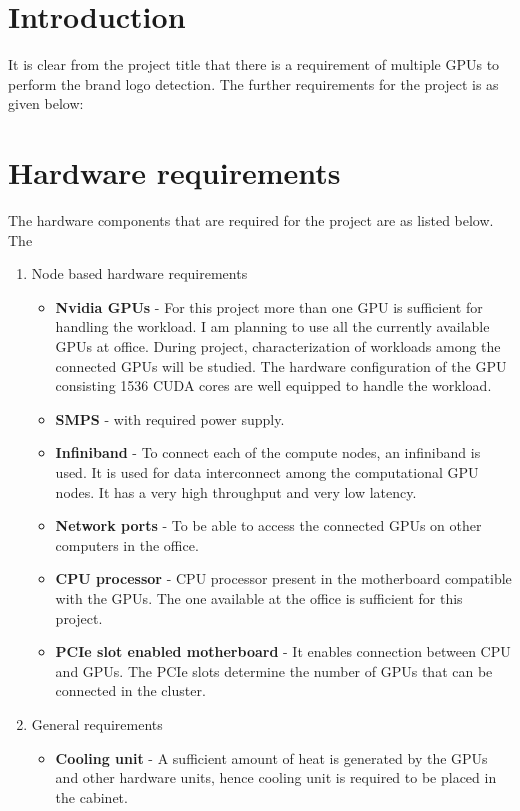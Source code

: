 \section{Introduction}
 It is clear from the project title that there is a requirement of multiple GPUs to perform the brand logo detection. The further requirements for the project is as given below:  
   
\section{Hardware requirements}
 The hardware components that are required for the project are as listed below. The 
 
 \begin{enumerate}
  \item Node based hardware requirements
   \begin{itemize}
     \item \textbf{Nvidia GPUs} - For this project more than one GPU is sufficient for handling the workload. I am planning to use all the currently available GPUs at office. During project, characterization of workloads among the connected GPUs will be studied. The hardware configuration of the GPU consisting 1536 CUDA cores are well equipped to handle the workload.  
  
     \item \textbf{SMPS} - with required power supply.
  
     \item \textbf{Infiniband} - To connect each of the compute nodes, an infiniband is used. It is used for data interconnect among the computational GPU nodes. It has a very high throughput and very low latency.    
  
     \item \textbf{Network ports} - To be able to access the connected GPUs on other computers in the office.
     
     \item \textbf{CPU processor} - CPU processor present in the motherboard compatible with the GPUs. The one available at the office is sufficient for this project.
     
     \item \textbf{PCIe slot enabled motherboard} - It enables connection between CPU and GPUs. The PCIe slots determine the number of GPUs that can be connected in the cluster.     
     
   \end{itemize}
   \item General requirements 
     \begin{itemize} 
     	\item \textbf{Cooling unit} - A sufficient amount of heat is generated by the GPUs and other hardware units, hence cooling unit is required to be placed in the cabinet.
     	

\end{itemize}
\end{enumerate}
